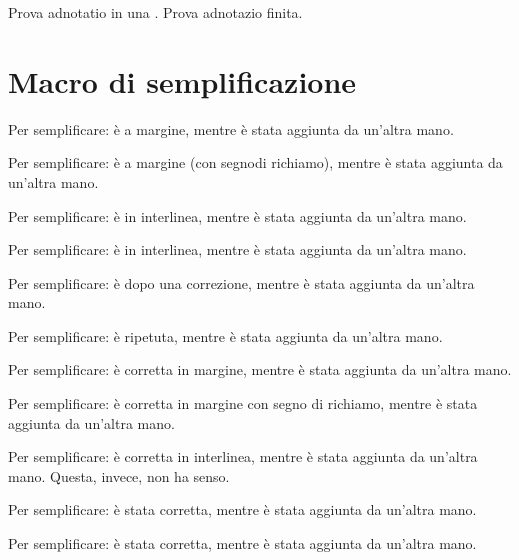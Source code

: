 \documentclass[12pt]{book}
\begin{document}
\par Prova adnotatio in una
. Prova
adnotazio finita.  \par
\section{Macro di semplificazione}
\par
{} Per semplificare:  \`e a
margine, mentre  \`e stata aggiunta da un'altra
mano.  \par
 Per semplificare:  \`e a margine
(con segnodi richiamo), mentre  \`e stata
aggiunta da un'altra mano.  \par
 Per semplificare:  \`e in interlinea, mentre  \`e stata
aggiunta da un'altra mano.  \par
 Per semplificare:  \`e in interlinea, mentre  \`e stata
aggiunta da un'altra mano.  \par
 Per semplificare:  \`e dopo una correzione, mentre  \`e stata
aggiunta da un'altra mano.  \par
 Per semplificare:  \`e ripetuta, mentre  \`e stata aggiunta da
un'altra mano.  \par
  Per semplificare:  \`e corretta in margine, mentre  \`e stata aggiunta da un'altra mano.  \par
 Per
semplificare:  \`e corretta in
margine con segno di richiamo, mentre  \`e stata aggiunta da un'altra mano.  \par
 Per
semplificare:  \`e corretta in
interlinea, mentre  \`e stata aggiunta
da un'altra mano.  Questa, invece, 
non ha senso.  \par
 Per semplificare:  \`e stata corretta, mentre  \`e
stata aggiunta da un'altra mano.  \par
 Per semplificare:  \`e stata corretta, mentre  \`e stata aggiunta da un'altra mano.  \par
\end{document}
